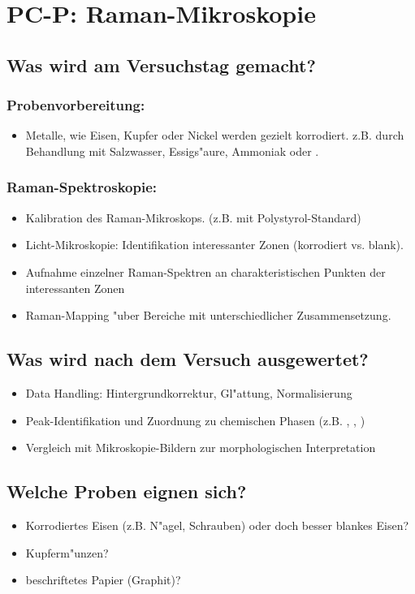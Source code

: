 \section*{PC-P: Raman-Mikroskopie}

\subsection*{Was wird am Versuchstag gemacht?}

\subsubsection*{Probenvorbereitung:} 
    \begin{itemize}
        \item Metalle, wie Eisen, Kupfer oder Nickel werden gezielt korrodiert.
         z.B. durch Behandlung mit Salzwasser, Essigs"aure, Ammoniak oder .
    \end{itemize}
\subsubsection*{Raman-Spektroskopie:}
    \begin{itemize}
        \item Kalibration des Raman-Mikroskops. (z.B. mit Polystyrol-Standard)
        \item Licht-Mikroskopie: Identifikation interessanter Zonen (korrodiert vs. blank).
        \item Aufnahme einzelner Raman-Spektren an charakteristischen Punkten der interessanten Zonen
        \item Raman-Mapping "uber Bereiche mit unterschiedlicher Zusammensetzung.
    \end{itemize}


\subsection*{Was wird nach dem Versuch ausgewertet?}

\begin{itemize}
    \item Data Handling: Hintergrundkorrektur, Gl"attung, Normalisierung
    \item Peak-Identifikation und Zuordnung zu chemischen Phasen (z.B. , , )
    \item Vergleich mit Mikroskopie-Bildern zur morphologischen Interpretation
\end{itemize}

\subsection*{Welche Proben eignen sich?}

\begin{itemize}
    \item Korrodiertes Eisen (z.B. N"agel, Schrauben) oder doch besser blankes Eisen?
    \item Kupferm"unzen?
    \item beschriftetes Papier (Graphit)?
\end{itemize}


